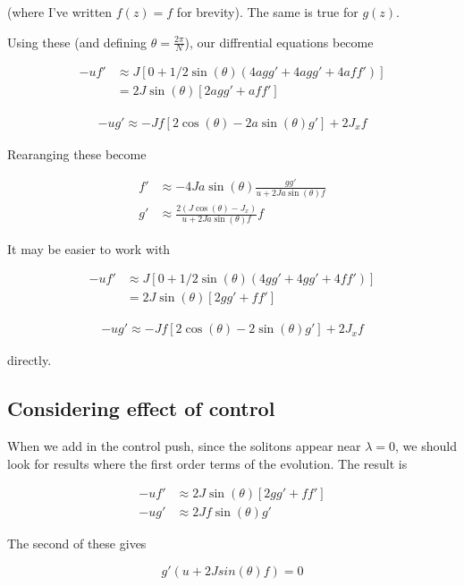 \documentclass{article}
\begin{document}
(where I've written $f(z) = f$ for brevity). The same is true for $g(z)$.

Using these (and defining $\theta = \frac{2\pi}{N}$), our diffrential equations become

\begin{align*}
    -uf' &\approx J[0 +1/2\sin(\theta)(4agg' + 4agg' + 4aff')] \\
            &= 2J\sin(\theta)[2agg' + aff']
\end{align*}

\begin{align*}
    -ug' \approx -Jf[2\cos(\theta) - 2a\sin(\theta)g'] + 2J_xf
\end{align*}

Rearanging these become

\begin{align*}
    f' &\approx -4Ja\sin(\theta)\frac{gg'}{u + 2Ja\sin(\theta)f} \\
    g' &\approx \frac{2(J\cos(\theta) - J_x)}{u + 2Ja\sin(\theta)f}f
\end{align*}

It may be easier to work with 

\begin{align*}
    -uf' &\approx J[0 +1/2\sin(\theta)(4gg' + 4gg' + 4ff')] \\
            &= 2J\sin(\theta)[2gg' + ff']
\end{align*}

\begin{align*}
    -ug' \approx -Jf[2\cos(\theta) - 2\sin(\theta)g'] + 2J_xf
\end{align*}

directly.

\subsection{Considering effect of control}

When we add in the control push, since the solitons appear near $\lambda = 0$, we should look for results where the first order terms of the evolution.
The result is 

\begin{align*}
    -uf' &\approx 2J\sin(\theta)[2gg' + ff'] \\
     -ug'&\approx 2Jf\sin(\theta)g'
\end{align*}

The second of these gives

\[
g'(u+2Jsin(\theta)f) = 0
\]
\end{document}
